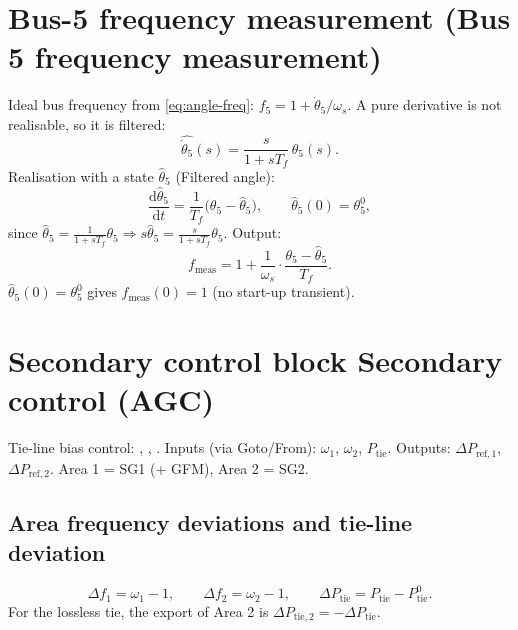 \documentclass[11pt,a4paper]{article}
\numberwithin{equation}{section}
\newcommand{\dd}{\mathrm{d}}
\newcommand{\blk}[1]{\textsf{#1}}
\begin{document}
\section{Bus-5 frequency measurement (\blk{Bus 5 frequency measurement})}
Ideal bus frequency from \eqref{eq:angle-freq}: $f_5 = 1 + \dot\theta_5/\omega_s$.
A pure derivative is not realisable, so it is filtered:
\begin{equation}
\widehat{\dot\theta_5}(s) = \frac{s}{1+sT_f}\,\theta_5(s).
\end{equation}
Realisation with a state $\hat\theta_5$ (\blk{Filtered angle}):
\begin{equation}
\boxed{\frac{\dd\hat\theta_5}{\dd t} = \frac{1}{T_f}\big(\theta_5 - \hat\theta_5\big),\qquad \hat\theta_5(0) = \theta_5^0,}
\end{equation}
since $\hat\theta_5 = \frac{1}{1+sT_f}\theta_5 \Rightarrow s\hat\theta_5 = \frac{s}{1+sT_f}\theta_5$. Output:
\begin{equation}
\boxed{f_{\text{meas}} = 1 + \frac{1}{\omega_s}\cdot\frac{\theta_5 - \hat\theta_5}{T_f}.}
\end{equation}
$\hat\theta_5(0)=\theta_5^0$ gives $f_{\text{meas}}(0)=1$ (no start-up transient).

\section{Secondary control block \blk{Secondary control (AGC)}}
%
\noindent Tie-line bias control: \cite[Ch.~11]{Kundur1994}, \cite{KothariNagrath2011}, \cite{KulkarniNPTEL}.
Inputs (via Goto/From): $\omega_1$, $\omega_2$, $P_{\text{tie}}$. Outputs: $\Delta P_{\text{ref},1}$, $\Delta P_{\text{ref},2}$.
Area 1 = SG1 (+ GFM), Area 2 = SG2.

\subsection{Area frequency deviations and tie-line deviation}
\begin{equation}
\Delta f_1 = \omega_1 - 1,\qquad \Delta f_2 = \omega_2 - 1,\qquad
\Delta P_{\text{tie}} = P_{\text{tie}} - P_{\text{tie}}^0 .
\end{equation}
For the lossless tie, the export of Area 2 is $\Delta P_{\text{tie},2} = -\Delta P_{\text{tie}}$.
\end{document}
